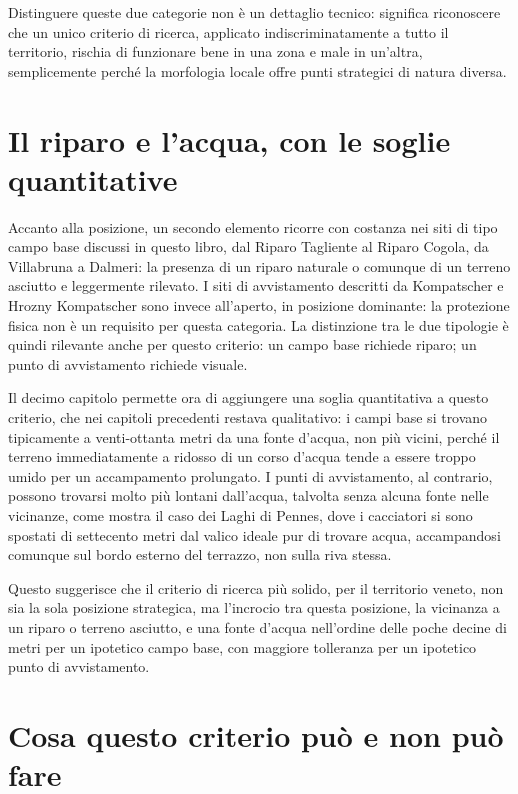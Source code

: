 Distinguere queste due categorie non è un dettaglio tecnico: significa riconoscere che un unico criterio di ricerca, applicato indiscriminatamente a tutto il territorio, rischia di funzionare bene in una zona e male in un'altra, semplicemente perché la morfologia locale offre punti strategici di natura diversa.

\section{Il riparo e l'acqua, con le soglie quantitative}

Accanto alla posizione, un secondo elemento ricorre con costanza nei siti di tipo campo base discussi in questo libro, dal Riparo Tagliente al Riparo Cogola, da Villabruna a Dalmeri: la presenza di un riparo naturale o comunque di un terreno asciutto e leggermente rilevato. I siti di avvistamento descritti da Kompatscher e Hrozny Kompatscher sono invece all'aperto, in posizione dominante: la protezione fisica non è un requisito per questa categoria. La distinzione tra le due tipologie è quindi rilevante anche per questo criterio: un campo base richiede riparo; un punto di avvistamento richiede visuale.

Il decimo capitolo permette ora di aggiungere una soglia quantitativa a questo criterio, che nei capitoli precedenti restava qualitativo: i campi base si trovano tipicamente a venti-ottanta metri da una fonte d'acqua, non più vicini, perché il terreno immediatamente a ridosso di un corso d'acqua tende a essere troppo umido per un accampamento prolungato. I punti di avvistamento, al contrario, possono trovarsi molto più lontani dall'acqua, talvolta senza alcuna fonte nelle vicinanze, come mostra il caso dei Laghi di Pennes, dove i cacciatori si sono spostati di settecento metri dal valico ideale pur di trovare acqua, accampandosi comunque sul bordo esterno del terrazzo, non sulla riva stessa.

Questo suggerisce che il criterio di ricerca più solido, per il territorio veneto, non sia la sola posizione strategica, ma l'incrocio tra questa posizione, la vicinanza a un riparo o terreno asciutto, e una fonte d'acqua nell'ordine delle poche decine di metri per un ipotetico campo base, con maggiore tolleranza per un ipotetico punto di avvistamento.

\section{Cosa questo criterio può e non può fare}

